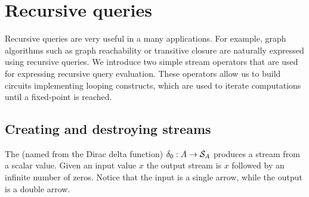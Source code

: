 \section{Recursive queries}\label{sec:recursion}

Recursive queries are very useful in a many applications.  For
example, graph algorithms such as graph reachability or transitive
closure are naturally expressed using recursive queries.  We introduce
two simple \dbsp stream operators that are used for expressing
recursive query evaluation.  These operators allow us to build
circuits implementing looping constructs, which are used to iterate
computations until a fixed-point is reached.

\subsection{Creating and destroying streams}



The  (named from the Dirac delta function)
$\delta_0 : A \rightarrow \mathcal{S}_{A}$ produces a stream from a scalar
value.  Given an input value $x$ the output stream is $x$ followed by
an infinite number of zeros.  Notice that the input is a single arrow,
while the output is a double arrow.

\begin{center}
\end{center}

